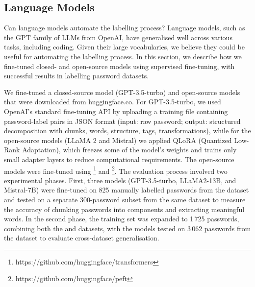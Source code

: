 \subsection{Language Models}

Can language models automate the labelling process? Language models, such as the GPT family of LLMs from OpenAI, have generalised well across various tasks, including coding. Given their large vocabularies, we believe they could be useful for automating the labelling process. In this section, we describe how we fine-tuned closed- and open-source models using supervised fine-tuning, with successful results in labelling password datasets.

We fine-tuned a closed-source model (GPT-3.5-turbo) and open-source models that were downloaded from huggingface.co. For GPT-3.5-turbo, we used OpenAI's standard fine-tuning API by uploading a training file containing password-label pairs in JSON format (input: raw password; output: structured decomposition with chunks, words, structure, tags, transformations), while for the open-source models (LLaMA 2 and Mistral) we applied QLoRA (Quantized Low-Rank Adaptation), which freezes some of the model's weights and trains only small adapter layers to reduce computational requirements. The open-source models were fine-tuned using \footnote{https://github.com/huggingface/transformers} and \footnote{https://github.com/huggingface/peft}. The evaluation process involved two experimental phases. First, three models (GPT-3.5-turbo, LLaMA2-13B, and Mistral-7B) were fine-tuned on 825 manually labelled passwords from the \phpbb dataset and tested on a separate 300-password subset from the same dataset to measure the accuracy of chunking passwords into components and extracting meaningful words. In the second phase, the training set was expanded to 1\,725 passwords, combining both the \phpbb and \hmail datasets, with the models tested on 3\,062 passwords from the \hmail dataset to evaluate cross-dataset generalisation.

